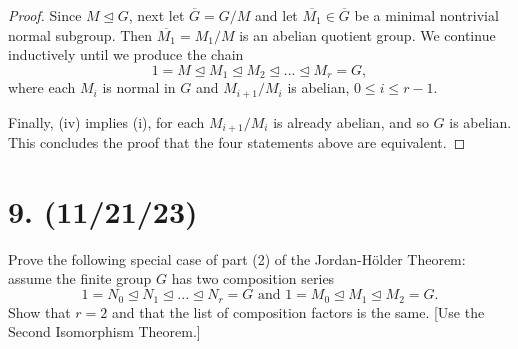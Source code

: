 \documentclass{article}
\begin{document}
\begin{proof}
Since $M \unlhd G$, next let $\overline{G} = G/M$ and let $\overline{M_1} \in \overline{G}$ be a minimal nontrivial normal subgroup. Then $\overline{M_1} = M_1/M$ is an abelian quotient group. We continue inductively until we produce the chain
\begin{equation*}
    1 = M \unlhd M_1 \unlhd M_2 \unlhd ... \unlhd M_r = G,
\end{equation*}
where each $M_i$ is normal in $G$ and $M_{i + 1}/M_i$ is abelian, $0 \leq i \leq r - 1$.

Finally, (iv) implies (i), for each $M_{i + 1}/M_i$ is already abelian, and so $G$ is abelian. This concludes the proof that the four statements above are equivalent.
\end{proof}

\section*{9. (11/21/23)}

Prove the following special case of part (2) of the Jordan-Hölder Theorem: assume the finite group $G$ has two composition series
\begin{equation*}
    1 = N_0 \unlhd N_1 \unlhd ... \unlhd N_r = G \text{ and } 1 = M_0 \unlhd M_1 \unlhd M_2 = G.
\end{equation*}
Show that $r = 2$ and that the list of composition factors is the same. [Use the Second Isomorphism Theorem.]
\end{document}
